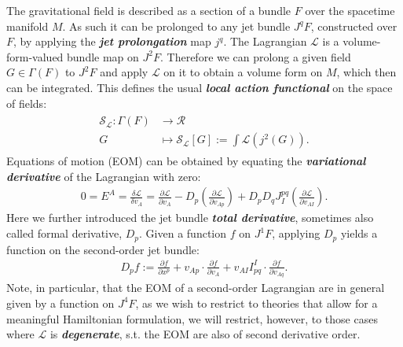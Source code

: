 \documentclass[%
 reprint,
nofootinbib,
 amsmath,amssymb,
 aps,
 prd,
floatfix,
]{revtex4-2}
\begin{document}
The gravitational field is described as a section of a bundle $F$ over the spacetime manifold $M$. As such it can be prolonged to any jet bundle $J^qF$, constructed over $F$, by applying the \textit{\textbf{jet prolongation}} map $j^q$. 
The Lagrangian $\mathcal{L}$ is a volume-form-valued bundle map on $J^2F$. Therefore we can prolong a given field $G \in \Gamma(F)$ to $J^2F$ and apply $\mathcal{L}$ on it to obtain a volume form on $M$, which then can be integrated.
This defines the usual \textit{\textbf{local action functional}} on the space of fields:
\begin{align}
\begin{aligned}
    \mathcal{S}_{\mathcal{L}} : \Gamma(F) &\longrightarrow \mathcal{R} \\
    G &\longmapsto \mathcal{S}_{\mathcal{L}}[G] := \int \mathcal{L}(j^2(G)).
\end{aligned}
\end{align}
Equations of motion (EOM) can be obtained by equating the \textit{\textbf{variational derivative}} of the Lagrangian with zero:
\begin{align}
  0 = E^A = \frac{\delta \mathcal{L}}{\delta v_A} = 
  \frac{\partial\mathcal{L}}{\partial v_A} - D_p ( \frac{\partial \mathcal{L}}{\partial v_{Ap}}) 
  + D_p D_q J^{pq}_I (\frac{\partial \mathcal{L}}{\partial v_{AI}}).
\end{align}
Here we further introduced the jet bundle \textit{\textbf{total derivative}}, sometimes also called formal derivative, $D_p$.
Given a function $f$ on $J^1F$, applying $D_p$ yields a function on the second-order jet bundle:
\begin{align}
    D_p f := \frac{\partial f}{\partial x^p} + v_{Ap} \cdot  \frac{\partial f}{\partial v_A} + v_{AI} I^{I}_{pq} \cdot \frac{\partial f}{ \partial v_{Aq}}.
\end{align}
Note, in particular, that the EOM of a second-order Lagrangian are in general given by a function on $J^4F$, as we wish to restrict to theories that allow for a meaningful Hamiltonian formulation, we will restrict, however, to those cases where $\mathcal{L}$ is \textit{\textbf{degenerate}}, s.t. the EOM are also of second derivative order. 
\end{document}
